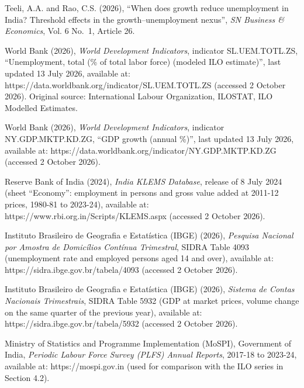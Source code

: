 \documentclass[12pt]{article}
\newcommand{\hone}[2]{\par\Needspace{4\baselineskip}\vspace{2pt}{\noindent\raggedright\bfseries
  \ifx\relax#1\relax\else\makebox[0.5in][l]{#1}\fi #2\par}\nopagebreak\vspace{-2pt}}
\begin{document}
Teeli, A.A. and Rao, C.S. (2026), “When does growth reduce unemployment in India? Threshold effects in the growth–unemployment nexus”, \textit{SN Business \& Economics}, Vol. 6 No.~1, Article 26.


\hone{}{Data sources}

World Bank (2026), \textit{World Development Indicators}, indicator SL.UEM.TOTL.ZS, “Unemployment, total (\% of total labor force) (modeled ILO estimate)”, last updated 13 July 2026, available at: https://data.worldbank.org/indicator/SL.UEM.TOTL.ZS (accessed 2 October 2026). Original source: International Labour Organization, ILOSTAT, ILO Modelled Estimates.


World Bank (2026), \textit{World Development Indicators}, indicator NY.GDP.MKTP.KD.ZG, “GDP growth (annual \%)”, last updated 13 July 2026, available at: https://data.worldbank.org/indicator/NY.GDP.MKTP.KD.ZG (accessed 2 October 2026).


Reserve Bank of India (2024), \textit{India KLEMS Database}, release of 8 July 2024 (sheet “Economy”: employment in persons and gross value added at 2011-12 prices, 1980-81 to 2023-24), available at: https://www.rbi.org.in/Scripts/KLEMS.aspx (accessed 2 October 2026).


Instituto Brasileiro de Geografia e Estatística (IBGE) (2026), \textit{Pesquisa Nacional por Amostra de Domicílios Contínua Trimestral}, SIDRA Table 4093 (unemployment rate and employed persons aged 14 and over), available at: https://sidra.ibge.gov.br/tabela/4093 (accessed 2 October 2026).


Instituto Brasileiro de Geografia e Estatística (IBGE) (2026), \textit{Sistema de Contas Nacionais Trimestrais}, SIDRA Table 5932 (GDP at market prices, volume change on the same quarter of the previous year), available at: https://sidra.ibge.gov.br/tabela/5932 (accessed 2 October 2026).


Ministry of Statistics and Programme Implementation (MoSPI), Government of India, \textit{Periodic Labour Force Survey (PLFS) Annual Reports}, 2017-18 to 2023-24, available at: https://mospi.gov.in (used for comparison with the ILO series in Section 4.2).
\end{document}
